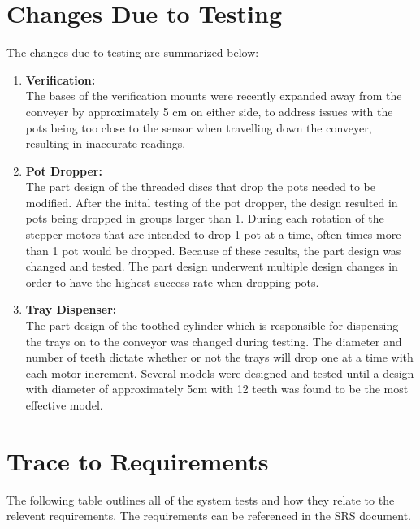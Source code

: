 \documentclass[12pt, titlepage]{article}
\begin{document}
\section{Changes Due to Testing}

The changes due to testing are summarized below:
\\
\begin{enumerate}
  \item \textbf{Verification:}\\
  The bases of the verification mounts were recently expanded away from the
  conveyer by approximately 5 cm on either side, to address issues with the pots being too close to the 
  sensor when travelling down the conveyer, resulting in inaccurate readings.

  \item \textbf{Pot Dropper:}\\
  The part design of the threaded discs that drop the pots needed to be modified.
  After the inital testing of the pot dropper, the design resulted in pots being dropped
  in groups larger than 1. During each rotation of the stepper motors that are intended to drop 1 pot
  at a time, often times more than 1 pot would be dropped. Because of these results, the part design was 
  changed and tested. The part design underwent multiple design changes in order to have the highest success rate 
  when dropping pots.

  \item \textbf{Tray Dispenser:}\\
  The part design of the toothed cylinder which is responsible for dispensing the trays on to the conveyor
  was changed during testing. The diameter and number of teeth dictate whether or not the trays will drop one at a time with 
  each motor increment. Several models were designed and tested until a design with diameter of approximately 5cm with 12 teeth was found to be the 
  most effective model.
\end{enumerate}
		
\section{Trace to Requirements}

The following table outlines all of the system tests and how they relate to the
relevent requirements. The requirements can be referenced in the SRS document.\\
\end{document}
